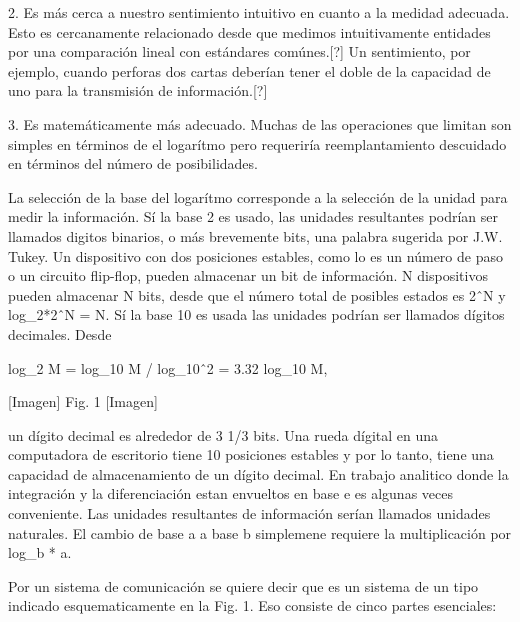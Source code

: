 2. Es más cerca a nuestro sentimiento intuitivo en cuanto a la medidad
adecuada. Esto es cercanamente relacionado desde que medimos
intuitivamente entidades por una comparación lineal con estándares
comúnes.[?] Un sentimiento, por ejemplo, cuando perforas dos cartas
deberían tener el doble de la capacidad de uno para la transmisión de
información.[?]

3. Es matemáticamente más adecuado. Muchas de las operaciones que
limitan son simples en términos de el logarítmo pero requeriría
reemplantamiento descuidado en términos del número de posibilidades.


La selección de la base del logarítmo corresponde a la selección de la
unidad para medir la información. Sí la base 2 es usado, las unidades
resultantes podrían ser llamados digitos binarios, o más brevemente
bits, una palabra sugerida por J.W. Tukey. Un dispositivo con dos
posiciones estables, como lo es un número de paso o un circuito
flip-flop, pueden almacenar un bit de información. N dispositivos
pueden almacenar N bits, desde que el número total de posibles estados
es 2ˆN y log_2*2ˆN = N. Sí la base 10 es usada las unidades podrían
ser llamados dígitos decimales. Desde

    log_2 M = log_10 M / log_10ˆ2
          = 3.32 log_10 M,

[Imagen] Fig. 1 [Imagen]

un dígito decimal es alrededor de 3 1/3 bits. Una rueda dígital en una
computadora de escritorio tiene 10 posiciones estables y por lo tanto,
tiene una capacidad de almacenamiento de un dígito decimal. En trabajo
analitico donde la integración y la diferenciación estan envueltos en
base e es algunas veces conveniente. Las unidades resultantes de
información serían llamados unidades naturales. El cambio de base a a
base b simplemene requiere la multiplicación por log_b * a.

Por un sistema de comunicación se quiere decir que es un sistema de un
tipo indicado esquematicamente en la Fig. 1. Eso consiste de cinco
partes esenciales:

